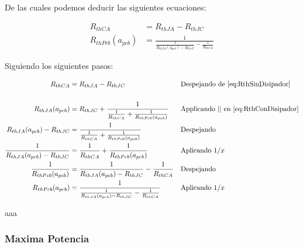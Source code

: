 De las cuales podemos deducir las siguientes ecuaciones:

\begin{subequations}
    \label{eq:ResRth}
    \begin{align}
        \label{eq:RthJA} R_{thCA}&=R_{thJA}-R_{thJC}  \\
        \label{eq:RthPcb} R_{thPcb}(a_{pcb})&=\frac{1}{\frac{1}{R_{thJA}(a_{pcb}) - R_{thJC}} -\frac{1}{R_{thCA}}}
    \end{align}
\end{subequations}

Siguiendo los siguientes pasos:

\begin{align*}
    R_{thCA}&=R_{thJA}-R_{thJC} &&\text{Despejando de \ref{eq:RthSinDisipador}} \\
    \\ 
    R_{thJA}(a_{pcb})&=R_{thJC}+\frac{1}{\frac{1}{R_{thCA}}+\frac{1}{R_{thPcb}(a_{pcb})}} &&\text{Applicando  || en  \ref{eq:RthConDisipador}} \\
    R_{thJA}(a_{pcb}) - R_{thJC} &=\frac{1}{\frac{1}{R_{thCA}}+\frac{1}{R_{thPcb}(a_{pcb})}} && \text{Despejando} \\ 
    \frac{1}{R_{thJA}(a_{pcb}) - R_{thJC}} &= \frac{1}{R_{thCA}}+\frac{1}{R_{thPcb}(a_{pcb})} && \text{Aplicando $1/x$}\\
    \frac{1}{R_{thPcb}(a_{pcb})}&=\frac{1}{R_{thJA}(a_{pcb}) - R_{thJC}} -\frac{1}{R_{thCA}} && \text{Despejando}\\
    R_{thPcb}(a_{pcb})&=\frac{1}{\frac{1}{R_{thJA}(a_{pcb}) - R_{thJC}} -\frac{1}{R_{thCA}}} &&\text{Aplicando $1/x$}
\end{align*}

aaa



\subsubsection{Maxima Potencia}

